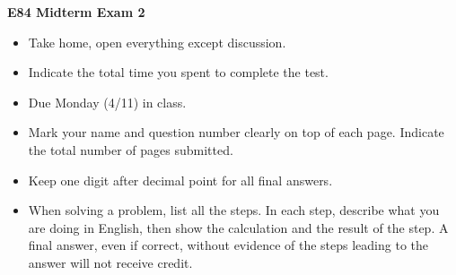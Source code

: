 \usepackage{html}

\begin{center}
{\Large \bf E84 Midterm Exam 2}
\end{center}

\begin{itemize}
\item Take home, open everything except discussion.
\item Indicate the total time you spent to complete the test.
\item Due Monday (4/11) in class.
\item Mark your name and question number clearly on top of each page.
	Indicate the total number of pages submitted.
\item Keep one digit after decimal point for all final answers. 
\item When solving a problem, list all the steps. In each step, describe 
	what you are doing in English, then show the calculation and the 
	result of the step. A final answer, even if correct, without 
	evidence of the steps leading to the answer will not receive credit.
\end{itemize}

